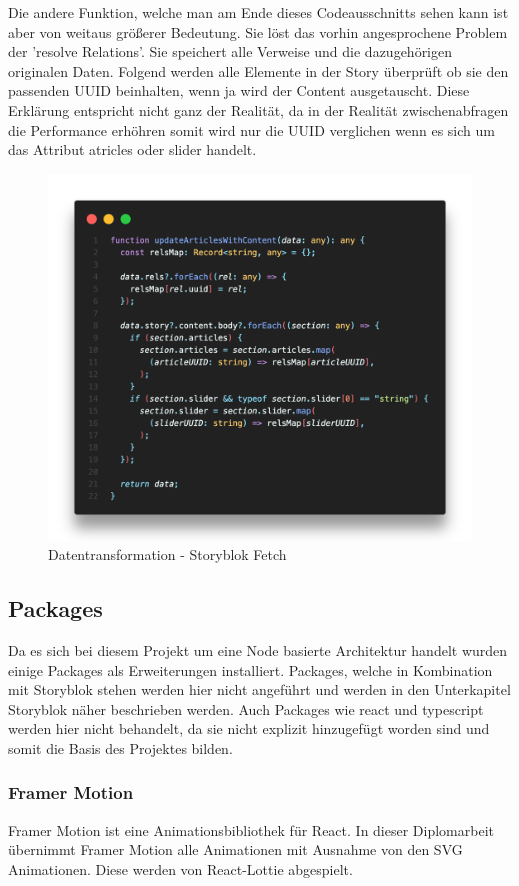 Die andere Funktion, welche man am Ende dieses Codeausschnitts sehen kann ist aber von weitaus größerer Bedeutung. Sie löst das vorhin angesprochene Problem der 'resolve Relations'. Sie speichert alle Verweise und die dazugehörigen originalen Daten. Folgend werden alle Elemente in der Story überprüft ob sie den passenden UUID beinhalten, wenn ja wird der Content ausgetauscht. Diese Erklärung entspricht nicht ganz der Realität, da in der Realität zwischenabfragen die Performance erhöhren somit wird nur die UUID verglichen wenn es sich um das Attribut atricles oder slider handelt.
\begin{figure}[H]
    \centering
    \includegraphics[width=\linewidth]{pics/sb-fetch-02.png}
    \caption{Datentransformation - Storyblok Fetch}
\end{figure}


\subsection{Packages}
Da es sich bei diesem Projekt um eine Node basierte Architektur handelt wurden einige Packages als Erweiterungen installiert. 
Packages, welche in Kombination mit Storyblok stehen werden hier nicht angeführt und werden in den Unterkapitel Storyblok näher beschrieben werden. Auch Packages wie react und typescript werden hier nicht behandelt, da sie nicht explizit hinzugefügt worden sind und somit die Basis des Projektes bilden.

\subsubsection*{Framer Motion}
Framer Motion ist eine Animationsbibliothek für React. In dieser Diplomarbeit übernimmt Framer Motion alle Animationen mit Ausnahme von den SVG Animationen. Diese werden von React-Lottie abgespielt.


